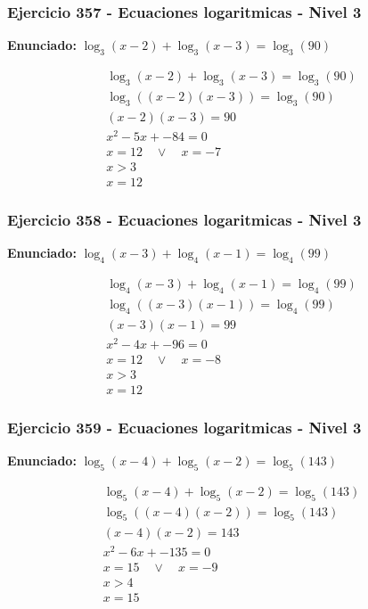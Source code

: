 \documentclass[12pt,a4paper]{article}
\begin{document}
\subsubsection*{Ejercicio 357 - Ecuaciones logaritmicas - Nivel 3}
\textbf{Enunciado:} \(\log_{3}\left(x-2\right)+\log_{3}\left(x-3\right)=\log_{3}\left(90\right)\)

\[
\begin{aligned}
\log_{3}\left(x-2\right)+\log_{3}\left(x-3\right)=\log_{3}\left(90\right)\\
\log_{3}\left((x-2)(x-3)\right)=\log_{3}\left(90\right)\\
(x-2)(x-3)=90\\
x^2-5x+-84=0\\
x=12\quad \vee\quad x=-7\\
x>3\\
\boxed{x=12}
\end{aligned}
\]


\subsubsection*{Ejercicio 358 - Ecuaciones logaritmicas - Nivel 3}
\textbf{Enunciado:} \(\log_{4}\left(x-3\right)+\log_{4}\left(x-1\right)=\log_{4}\left(99\right)\)

\[
\begin{aligned}
\log_{4}\left(x-3\right)+\log_{4}\left(x-1\right)=\log_{4}\left(99\right)\\
\log_{4}\left((x-3)(x-1)\right)=\log_{4}\left(99\right)\\
(x-3)(x-1)=99\\
x^2-4x+-96=0\\
x=12\quad \vee\quad x=-8\\
x>3\\
\boxed{x=12}
\end{aligned}
\]


\subsubsection*{Ejercicio 359 - Ecuaciones logaritmicas - Nivel 3}
\textbf{Enunciado:} \(\log_{5}\left(x-4\right)+\log_{5}\left(x-2\right)=\log_{5}\left(143\right)\)

\[
\begin{aligned}
\log_{5}\left(x-4\right)+\log_{5}\left(x-2\right)=\log_{5}\left(143\right)\\
\log_{5}\left((x-4)(x-2)\right)=\log_{5}\left(143\right)\\
(x-4)(x-2)=143\\
x^2-6x+-135=0\\
x=15\quad \vee\quad x=-9\\
x>4\\
\boxed{x=15}
\end{aligned}
\]
\end{document}
